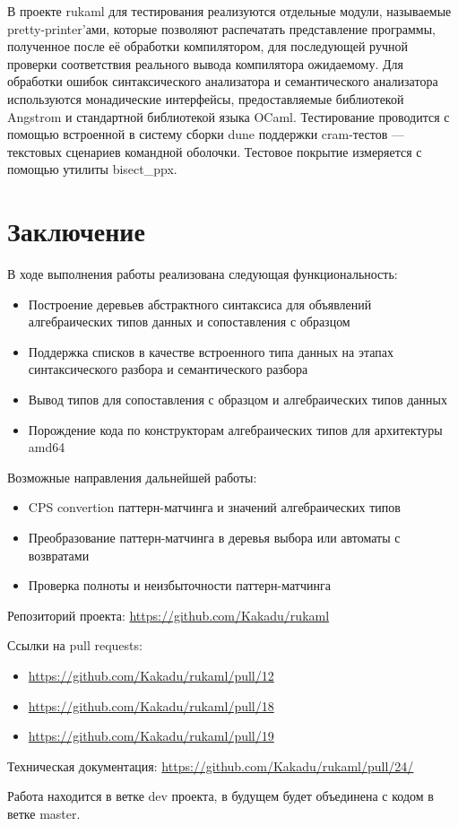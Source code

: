 \documentclass[a4paper]{article}
\begin{document}
В проекте rukaml для тестирования реализуются отдельные модули, называемые pretty-printer'ами, которые позволяют распечатать представление программы, полученное после её обработки компилятором, для последующей ручной проверки соответствия реального вывода компилятора ожидаемому.
Для обработки ошибок синтаксического анализатора и семантического анализатора используются монадические интерфейсы, предоставляемые библиотекой Angstrom и стандартной библиотекой языка OCaml.
Тестирование проводится с помощью встроенной в систему сборки dune поддержки cram-тестов — текстовых сценариев командной оболочки. Тестовое покрытие измеряется с помощью утилиты bisect\_ppx.

\section{Заключение}

В ходе выполнения работы реализована следующая функциональность:

\begin{itemize}
    \item Построение деревьев абстрактного синтаксиса для объявлений алгебраических типов данных и сопоставления с образцом
    \item Поддержка списков в качестве встроенного типа данных на этапах синтаксического разбора и семантического разбора
    \item Вывод типов для сопоставления с образцом и алгебраических типов данных
    \item Порождение кода по конструкторам алгебраических типов для архитектуры amd64
\end{itemize}

Возможные направления дальнейшей работы:

\begin{itemize}
    \item CPS convertion паттерн-матчинга и значений алгебраических типов
    \item Преобразование паттерн-матчинга в деревья выбора или автоматы с возвратами
    \item Проверка полноты и неизбыточности паттерн-матчинга
\end{itemize}


Репозиторий проекта: \url{https://github.com/Kakadu/rukaml}


Ссылки на pull requests:
\begin{itemize}
    \item \url{https://github.com/Kakadu/rukaml/pull/12}
    \item \url{https://github.com/Kakadu/rukaml/pull/18}
    \item \url{https://github.com/Kakadu/rukaml/pull/19}
\end{itemize}


Техническая документация: \url{https://github.com/Kakadu/rukaml/pull/24/}


Работа находится в ветке dev проекта, в будущем будет объединена с кодом в ветке master.
\end{document}
